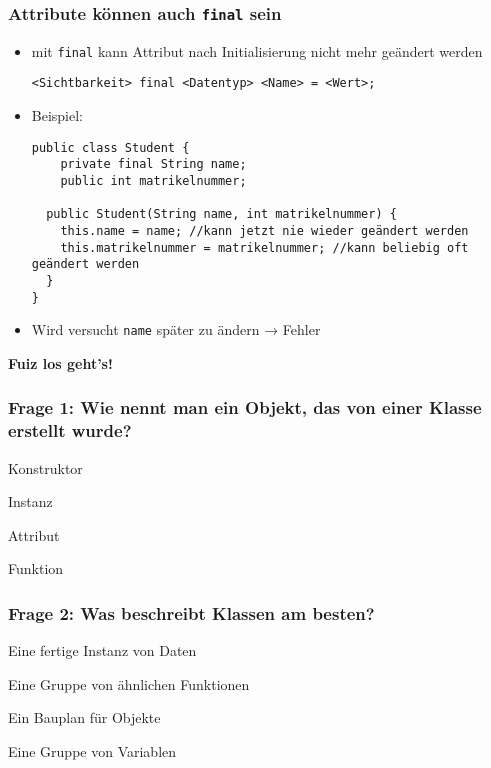 \documentclass{../../presentation}
\begin{document}
\begin{frame}[fragile]
	\frametitle{Attribute können auch \texttt{final} sein}

	\begin{itemize}
		\item<2-> mit \texttt{final} kann Attribut nach Initialisierung nicht mehr geändert werden
		      \begin{verbatim}
<Sichtbarkeit> final <Datentyp> <Name> = <Wert>;
		\end{verbatim}
		\item<3-> Beispiel:
		      \begin{verbatim}
public class Student {
    private final String name;
    public int matrikelnummer;
    
  public Student(String name, int matrikelnummer) {
    this.name = name; //kann jetzt nie wieder geändert werden
    this.matrikelnummer = matrikelnummer; //kann beliebig oft geändert werden
  }
}
\end{verbatim}

		\item<4-> Wird versucht \texttt{name} später zu ändern → \alert{Fehler}
	\end{itemize}

\end{frame}


\begin{frame}[plain]
	\centering
	{\Huge\bfseries{Fuiz los geht's!}}
\end{frame}

\begin{frame}[fragile]
	\frametitle{Frage 1: Wie nennt man ein Objekt, das von einer Klasse erstellt wurde?}
	\begin{ausgabe}
		Konstruktor
	\end{ausgabe}
	\begin{ausgabe}
		\textcolor<2->{green!100!black}{Instanz}
	\end{ausgabe}
	\begin{ausgabe}
		Attribut
	\end{ausgabe}
	\begin{ausgabe}
		Funktion
	\end{ausgabe}

\end{frame}

\begin{frame}[fragile]
	\frametitle{Frage 2: Was beschreibt Klassen am besten?}
	\begin{ausgabe}
		Eine fertige Instanz von Daten
	\end{ausgabe}
	\begin{ausgabe}
		Eine Gruppe von ähnlichen Funktionen
	\end{ausgabe}
	\begin{ausgabe}
		\textcolor<2->{green!100!black}{Ein Bauplan für Objekte}
	\end{ausgabe}
	\begin{ausgabe}
		Eine Gruppe von Variablen
	\end{ausgabe}
\end{frame}
\end{document}
